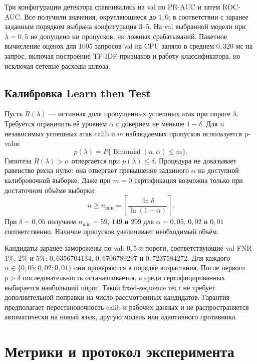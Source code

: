 \documentclass{misisarticle}
\begin{document}
Три конфигурации детектора сравнивались на val по PR-AUC и затем ROC-AUC. Все получили значения, округляющиеся до $1{,}0$; в соответствии с заранее заданным порядком выбрана конфигурация 3--5. На val выбранной модели при $\lambda=0{,}5$ не допущено ни пропусков, ни ложных срабатываний. Пакетное вычисление оценок для 1005 запросов val на CPU заняло в среднем $0{,}320$ мс на запрос, включая построение TF-IDF-признаков и работу классификатора, но исключая сетевые расходы шлюза.

\subsection{Калибровка Learn then Test}

Пусть $R(\lambda)$ --- истинная доля пропущенных успешных атак при пороге $\lambda$. Требуется ограничить её уровнем $\alpha$ с доверием не меньше $1-\delta$. Для $n$ независимых успешных атак calib и $m$ наблюдаемых пропусков используется p-value
\begin{equation}
  p(\lambda)=P\{\operatorname{Binomial}(n,\alpha)\leq m\}.
  \label{eq:pvalue}
\end{equation}
Гипотеза $R(\lambda)>\alpha$ отвергается при $p(\lambda)\leq\delta$. Процедура не доказывает равенство риска нулю: она отвергает превышение заданного $\alpha$ на доступной калибровочной выборке. Даже при $m=0$ сертификация возможна только при достаточном объёме выборки:
\begin{equation}
  n\geq n_{\min}=\left\lceil\frac{\ln\delta}{\ln(1-\alpha)}\right\rceil.
  \label{eq:nmin}
\end{equation}
При $\delta=0{,}05$ получаем $n_{\min}=59$, $149$ и $299$ для $\alpha=0{,}05$, $0{,}02$ и $0{,}01$ соответственно. Наличие пропусков увеличивает необходимый объём.

Кандидаты заранее заморожены по val: $0{,}5$ и пороги, соответствующие val FNR $1\%$, $2\%$ и $5\%$: $0{,}6356704134$, $0{,}6706789297$ и $0{,}7237584272$. Для каждого $\alpha\in\{0{,}05;0{,}02;0{,}01\}$ они проверяются в порядке возрастания. После первого $p>\delta$ последовательность останавливается, а среди сертифицированных выбирается наибольший порог. Такой fixed-sequence тест не требует дополнительной поправки на число рассмотренных кандидатов. Гарантия предполагает перестановочность calib и рабочих данных и не распространяется автоматически на новый язык, другую модель или адаптивного противника.

\section{Метрики и протокол эксперимента}
\end{document}
